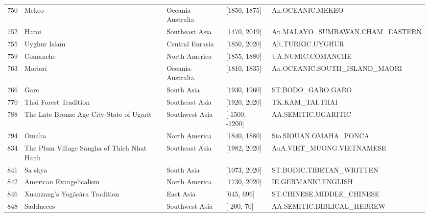 {\begin{longtable}{rp{3.5cm}llp{3.5cm}}
750 & {\raggedright Mekeo} & Oceania-Australia & [1850, 1875] & {\raggedright An.\allowbreak{}OCEANIC.\allowbreak{}MEKEO} \\
752 & {\raggedright Haroi} & Southeast Asia & [1470, 2019] & {\raggedright An.\allowbreak{}MALAYO\_\allowbreak{}SUMBAWAN.\allowbreak{}CHAM\_\allowbreak{}EASTERN} \\
755 & {\raggedright Uyghur Islam} & Central Eurasia & [1850, 2020] & {\raggedright Alt.\allowbreak{}TURKIC.\allowbreak{}UYGHUR} \\
759 & {\raggedright Comanche} & North America & [1855, 1880] & {\raggedright UA.\allowbreak{}NUMIC.\allowbreak{}COMANCHE} \\
763 & {\raggedright Moriori} & Oceania-Australia & [1810, 1835] & {\raggedright An.\allowbreak{}OCEANIC.\allowbreak{}SOUTH\_\allowbreak{}ISLAND\_\allowbreak{}MAORI} \\
766 & {\raggedright Garo} & South Asia & [1930, 1960] & {\raggedright ST.\allowbreak{}BODO\_\allowbreak{}GARO.\allowbreak{}GARO} \\
770 & {\raggedright Thai Forest Tradition} & Southeast Asia & [1920, 2020] & {\raggedright TK.\allowbreak{}KAM\_\allowbreak{}TAI.\allowbreak{}THAI} \\
788 & {\raggedright The Late Bronze Age City-State of Ugarit} & Southwest Asia & [-1500, -1200] & {\raggedright AA.\allowbreak{}SEMITIC.\allowbreak{}UGARITIC} \\
794 & {\raggedright Omaha} & North America & [1840, 1880] & {\raggedright Sio.\allowbreak{}SIOUAN.\allowbreak{}OMAHA\_\allowbreak{}PONCA} \\
834 & {\raggedright The Plum Village Sangha of Thich Nhat Hanh} & Southeast Asia & [1982, 2020] & {\raggedright AuA.\allowbreak{}VIET\_\allowbreak{}MUONG.\allowbreak{}VIETNAMESE} \\
841 & {\raggedright Sa skya} & South Asia & [1073, 2020] & {\raggedright ST.\allowbreak{}BODIC.\allowbreak{}TIBETAN\_\allowbreak{}WRITTEN} \\
842 & {\raggedright American Evangelicalism} & North America & [1730, 2020] & {\raggedright IE.\allowbreak{}GERMANIC.\allowbreak{}ENGLISH} \\
846 & {\raggedright Xuanzang's Yogācāra Tradition} & East Asia & [645, 696] & {\raggedright ST.\allowbreak{}CHINESE.\allowbreak{}MIDDLE\_\allowbreak{}CHINESE} \\
848 & {\raggedright Sadducees} & Southwest Asia & [-200, 70] & {\raggedright AA.\allowbreak{}SEMITIC.\allowbreak{}BIBLICAL\_\allowbreak{}HEBREW} \\

\end{longtable}}

